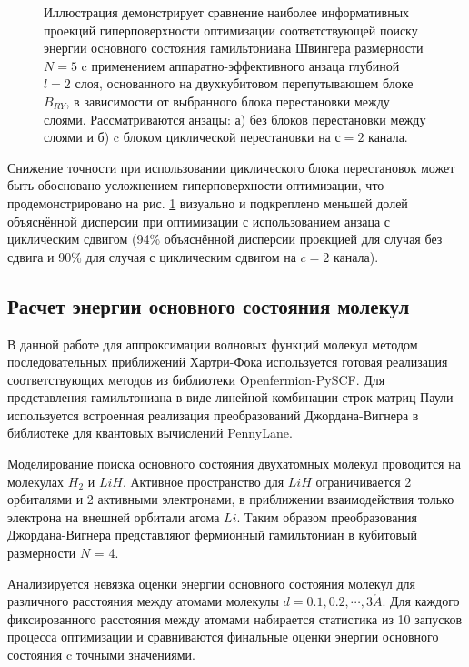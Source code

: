 \documentclass[14pt]{extarticle}
\begin{document}
\begin{figure}[H]
\begin{minipage}[H]{0.49\linewidth}
\end{minipage}
\caption{Иллюстрация демонстрирует сравнение наиболее информативных проекций гиперповерхности оптимизации соответствующей поиску энергии основного состояния гамильтониана Швингера размерности $N = 5$ c применением аппаратно-эффективного анзаца глубиной $l = 2$ слоя, основанного на двухкубитовом перепутывающем блоке $B_{RY}$, в зависимости от выбранного блока перестановки между слоями. Рассматриваются анзацы: а) без блоков перестановки между слоями и б) c блоком циклической перестановки на $с = 2$ канала.}\label{fig:proj_comp_permut}
\end{figure}

\qquad Снижение точности при использовании циклического блока перестановок может быть обосновано усложнением гиперповерхности оптимизации, что продемонстрировано на рис. \ref{fig:proj_comp_permut} визуально и подкреплено меньшей долей объяснённой дисперсии при оптимизации с использованием анзаца с циклическим сдвигом (94\% объяснённой дисперсии проекцией для случая без сдвига и 90\% для случая с циклическим сдвигом на $c = 2$ канала).

\subsection{Расчет энергии основного состояния молекул}


\qquad В данной работе для аппроксимации волновых функций молекул методом последовательных приближений Хартри-Фока используется готовая реализация соответствующих методов из библиотеки Openfermion-PySCF. Для представления гамильтониана в виде линейной комбинации строк матриц Паули используется встроенная реализация преобразований Джордана-Вигнера в библиотеке для квантовых вычислений PennyLane.

\qquad Моделирование поиска основного состояния двухатомных молекул проводится на молекулах $H_2$ и $LiH$. Активное пространство для $LiH$ ограничивается 2 орбиталями и 2 активными электронами, в приближении взаимодействия только электрона на внешней орбитали атома $Li$. Таким образом преобразования Джордана-Вигнера представляют фермионный гамильтониан в кубитовый размерности $N$ = 4.

\qquad Анализируется невязка оценки энергии основного состояния молекул для различного расстояния между атомами молекулы $d = 0.1, 0.2, \cdots , 3 \mathring A$. Для каждого фиксированного расстояния между атомами набирается статистика из 10 запусков процесса оптимизации и сравниваются финальные оценки энергии основного состояния c точными значениями.
\end{document}
